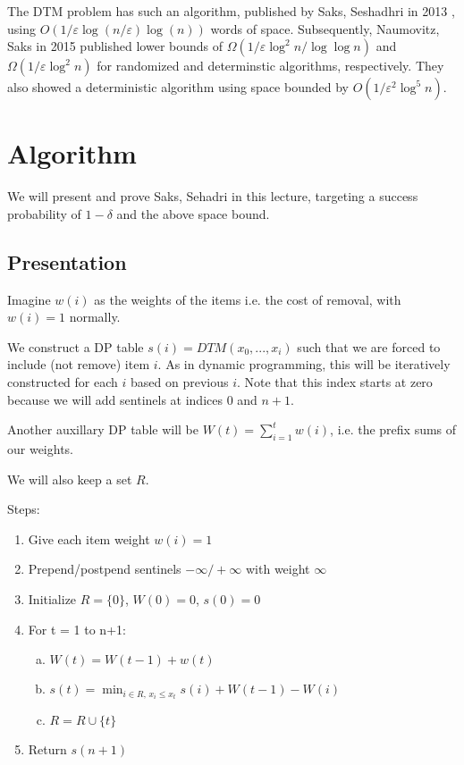 \documentclass[11pt]{article}
\newcommand{\ve}{\varepsilon}
\begin{document}
The DTM problem has such an algorithm, published by Saks, Seshadhri in 2013 \cite{SaksCS13},
using $O(1/\ve \log(n/\ve) \log (n))$ words of space. Subsequently, Naumovitz,
Saks in 2015 \cite{NaumovitzMS15} published lower bounds of
$\Omega(1/\ve \log^2 n / \log \log n)$ and
$\Omega(1/\ve \log^2 n)$ for randomized and determinstic algorithms,
respectively.
They also showed a deterministic algorithm using space bounded by $O(1/\ve^2
\log^5 n)$.

\section{Algorithm}

We will present and prove Saks, Sehadri in this lecture, targeting a success
probability of $1 - \delta$ and the above space bound.

\subsection{Presentation}

Imagine $w(i)$ as the weights of the items i.e. the cost of removal,
with $w(i) = 1$ normally.

We construct a DP table $s(i) = DTM(x_0, ..., x_i)$ such that we are forced to
include (not remove) item $i$. As in dynamic programming, this will be
iteratively constructed for each $i$ based on previous $i$. Note that this index
starts at zero because we will add sentinels at indices 0 and $n + 1$.

Another auxillary DP table will be $W(t) = \sum_{i=1}^{t} w(i)$, i.e. the prefix
sums of our weights.

We will also keep a set $R$.

Steps:
\begin{enumerate}
\item Give each item weight $w(i) = 1$
\item Prepend/postpend sentinels $-\infty/+\infty$ with weight $\infty$
\item Initialize $R=\{0\}$, $W(0) = 0$, $s(0)= 0$
\item For t = 1 to n+1:
\begin{enumerate}[a.]
\item $W(t) = W(t - 1) + w(t)$
\item $s(t) = \min_{i \in R,\,x_i \leq x_t} {s(i) + W(t - 1) - W(i)}$
\item $R = R \cup \{t\}$
\end{enumerate}
\item Return $s(n+1)$
\end{enumerate}
\end{document}

